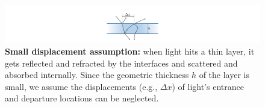 \begin{figure}[t]
	\includegraphics[width=0.6\columnwidth]{img/illustration/assumption.pdf}
	\caption{\label{fig:thin_layer}
		\textbf{Small displacement assumption:}
		when light hits a thin layer, it gets reflected and refracted by the interfaces and scattered and absorbed internally.
		Since the geometric thickness $h$ of the layer is small, we assume the displacements (e.g., $\Delta x$) of light's entrance and departure locations can be neglected.
	}
\end{figure}